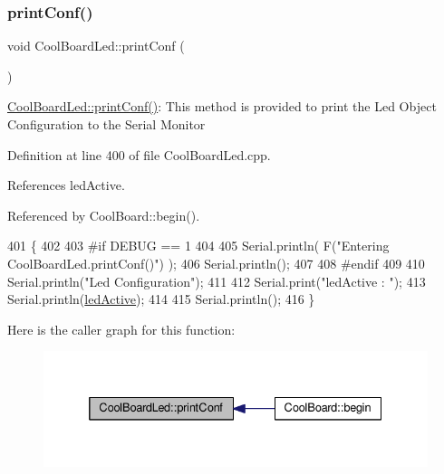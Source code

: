 \subsubsection{\texorpdfstring{print\+Conf()}{printConf()}}
{\footnotesize\ttfamily void Cool\+Board\+Led\+::print\+Conf (\begin{DoxyParamCaption}{ }\end{DoxyParamCaption})}

\hyperlink{classCoolBoardLed_a8ed3053a36f0ed4a131f43b5b17efb61}{Cool\+Board\+Led\+::print\+Conf()}\+: This method is provided to print the Led Object Configuration to the Serial Monitor 

Definition at line 400 of file Cool\+Board\+Led.\+cpp.



References led\+Active.



Referenced by Cool\+Board\+::begin().


\begin{DoxyCode}
401 \{
402 
403 \textcolor{preprocessor}{#if DEBUG == 1 }
404 
405     Serial.println( F(\textcolor{stringliteral}{"Entering CoolBoardLed.printConf()"}) );
406     Serial.println();
407 
408 \textcolor{preprocessor}{#endif}
409 
410     Serial.println(\textcolor{stringliteral}{"Led Configuration"});
411 
412     Serial.print(\textcolor{stringliteral}{"ledActive : "});
413     Serial.println(\hyperlink{classCoolBoardLed_a5f17c135516fcf4b44ea8a096ba0177a}{ledActive});
414 
415     Serial.println();   
416 \}
\end{DoxyCode}
Here is the caller graph for this function\+:\nopagebreak
\begin{figure}[H]
\begin{center}
\leavevmode
\includegraphics[width=332pt]{classCoolBoardLed_a8ed3053a36f0ed4a131f43b5b17efb61_icgraph}
\end{center}
\end{figure}
\mbox{\label{classCoolBoardLed_ad5f0de4c628cbfbf49896042831c64ad}} 
